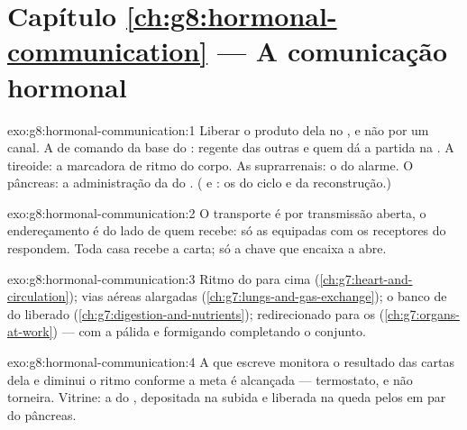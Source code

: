 \section*{Capítulo \ref{ch:g8:hormonal-communication} --- A comunicação hormonal}

\begin{solution}{exo:g8:hormonal-communication:1}
Liberar o produto dela no , e não por um canal. A  de
comando da base do : regente das outras e quem dá a partida na
. A tireoide: a marcadora de ritmo do corpo. As suprarrenais:
o  do alarme. O pâncreas: a administração da  do
. ( e : os  do ciclo e da
reconstrução.)
\end{solution}

\begin{solution}{exo:g8:hormonal-communication:2}
O transporte é por transmissão aberta, o endereçamento é do lado de
quem recebe: só as  equipadas com os receptores do 
respondem. Toda casa recebe a carta; só a chave que encaixa a abre.
\end{solution}

\begin{solution}{exo:g8:hormonal-communication:3}
Ritmo do  para cima (\cref{ch:g7:heart-and-circulation}); vias
aéreas alargadas (\cref{ch:g7:lungs-and-gas-exchange}); o banco de
 do  liberado
(\cref{ch:g7:digestion-and-nutrients});  redirecionado para os
 (\cref{ch:g7:organs-at-work}) --- com a  pálida e
formigando completando o conjunto.
\end{solution}

\begin{solution}{exo:g8:hormonal-communication:4}
A  que escreve monitora o resultado das cartas dela e diminui
o ritmo conforme a meta é alcançada --- termostato, e não torneira.
Vitrine: a  do , depositada na subida e liberada na
queda pelos  em par do pâncreas.
\end{solution}

